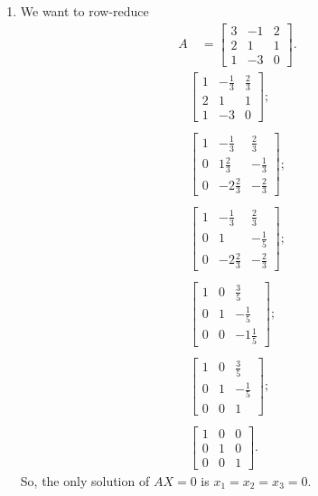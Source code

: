 \documentclass[12pt]{article}
\begin{document}
\begin{enumerate}
    \item
      We want to row-reduce
      \begin{align*}
        A\ & =
        \begin{bmatrix}
          3 & -1 & 2\\
          2 &  1 & 1\\
          1 & -3 & 0
        \end{bmatrix}.
      \end{align*}
      \begin{align*}
        \begin{bmatrix}
          1 & -\frac{1}{3} & \frac{2}{3}\\
          2 &  1 & 1\\
          1 & -3 & 0
        \end{bmatrix};\\\\
        \begin{bmatrix}
          1 & -\frac{1}{3}  & \frac{2}{3}\\
          0 &  1\frac{2}{3} & -\frac{1}{3}\\
          0 & -2\frac{2}{3} & -\frac{2}{3}
        \end{bmatrix};\\\\
        \begin{bmatrix}
          1 & -\frac{1}{3}  & \frac{2}{3}\\
          0 &  1            & -\frac{1}{5}\\
          0 & -2\frac{2}{3} & -\frac{2}{3}
        \end{bmatrix};\\\\
        \begin{bmatrix}
          1 & 0 & \frac{3}{5}\\
          0 & 1 & -\frac{1}{5}\\
          0 & 0 & -1\frac{1}{5}
        \end{bmatrix};\\\\
        \begin{bmatrix}
          1 & 0 & \frac{3}{5}\\
          0 & 1 & -\frac{1}{5}\\
          0 & 0 & 1
        \end{bmatrix};\\\\
        \begin{bmatrix}
          1 & 0 & 0\\
          0 & 1 & 0\\
          0 & 0 & 1
        \end{bmatrix}.
      \end{align*}
      So, the only solution of $AX = 0$ is $x_1 = x_2 = x_3 = 0$.


\end{enumerate}
\end{document}
